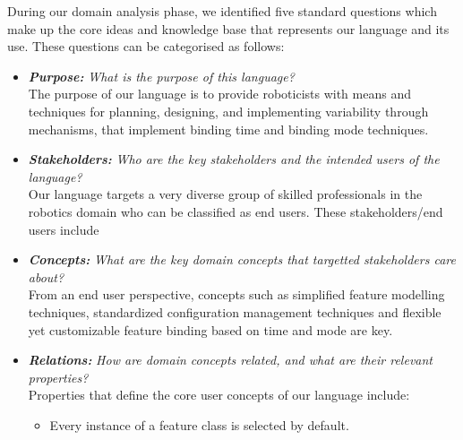 \documentclass[conference]{IEEEtran}
\begin{document}
During our domain analysis phase, we identified five standard questions which make up the core ideas and knowledge base that represents our language and its use. These questions can be categorised as follows:
    \begin{itemize}
        \item \textit{\textbf{Purpose:}} \textit{What is the purpose of this language?}\\
        The purpose of our language is to provide roboticists with means and techniques for planning, designing, and implementing variability through mechanisms, that implement binding time and binding mode techniques.
        \item \textit{\textbf{Stakeholders:}} \textit{Who are the key stakeholders and the intended users of the language?}\\ Our language targets a very diverse group of skilled professionals in the robotics domain who can be classified as end users. These stakeholders/end users include 
        \item \textit{\textbf{Concepts:}} \textit{What are the key domain concepts that targetted stakeholders care about?}\\ From an end user perspective, concepts such as simplified feature modelling techniques, standardized configuration management techniques and flexible yet customizable feature binding based on time and mode are key.
        \item \textit{\textbf{Relations:}} \textit{How are domain concepts related, and what are their relevant properties?}\\
        Properties that define the core user concepts of our language include:
        \begin{itemize}
            \item Every instance of a feature class is selected by default.

\end{itemize}
\end{itemize}
\end{document}
